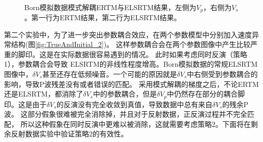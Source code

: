 \begin{figure}[!hbt]
   \centering
   \\
   \caption{Born模拟数据模式解耦ERTM与ELSRTM结果，左侧为$V_p$，右侧为$V_s$。第一行为ERTM结果，第二行为ELSRTM结果。}
   \label{fig:decomp_2}
\end{figure}
第二个实验中，为了进一步突出参数耦合效应，在两个参数模型中分别加入速度异常结构(图\ref{fig:TrueAndInitial_2})。
这样参数耦合会在两个参数图像中产生比较严重的脚印。这是在实际数据很容易遇到的情况。
此时如果考虑同时反演（策略1），参数耦合会导致
ELSRTM的非线性程度增高。Born模拟数据的常规ELSRTM图像中，$\delta
V_s$甚至还存在低频噪音。一个可能的原因就是$\delta V_s$中右侧受到参数耦合的影响，导致P波残差没有或者错误的匹配。
采用模式解耦的梯度之后，不论ERTM还是ELSRTM，都消除了$\delta
V_s$中的参数耦合，但是$\delta
V_p$中仍然存在部分的耦合脚印。这是由于$\delta
V_s$的反演没有完全收敛到真值，导致数据中总有来自$\delta V_s$的残余P波。
这部分假象很难被完全消除掉，并且对于反射数据，正反演过程并不完全匹配，
所以这种假象在同时反演中更难以被消除，这就需要考虑策略2。下面将在剩余反射数据实验中验证策略2的有效性。

